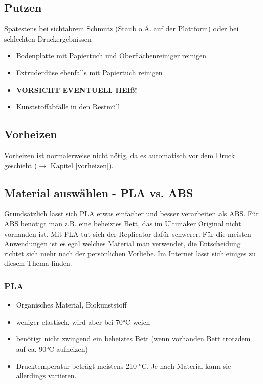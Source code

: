\documentclass{\basedir/fablab-document}
\begin{document}
\subsection{Putzen} \label{putzen}

Spätestens bei sichtabrem Schmutz (Staub o.Ä. auf der Plattform) oder bei schlechten Druckergebnissen

\begin{itemize}
 \item Bodenplatte mit Papiertuch und Oberflächenreiniger reinigen
 \item Extruderdüse ebenfalls mit Papiertuch reinigen
 \item \textbf{VORSICHT EVENTUELL HEIß!}
 \item Kunststoffabfälle in den Restmüll
\end{itemize}

\subsection{Vorheizen}
Vorheizen ist normalerweise nicht nötig, da es automatisch vor dem Druck geschieht ($\to$ Kapitel \ref{vorheizen}).

\subsection{Material auswählen - PLA vs. ABS}
Grundsätzlich lässt sich PLA etwas einfacher und besser verarbeiten als ABS. Für ABS benötigt man z.B. eine beheiztes
Bett, das im Ultimaker Original nicht vorhanden ist. Mit PLA tut sich der Replicator dafür schwerer. Für die meisten
Anwendungen ist es egal welches Material man verwendet, die Entscheidung richtet sich mehr nach der persönlichen
Vorliebe. Im Internet lässt sich einiges zu diesem Thema finden.

\subsubsection{PLA}
\begin{itemize}
\item Organisches Material, Biokunststoff
\item weniger elastisch, wird aber bei 70°C weich
\item benötigt nicht zwingend ein beheiztes Bett (wenn vorhanden Bett trotzdem auf ca. 90°C aufheizen)
\item Drucktemperatur beträgt meistens 210 °C. Je nach Material kann sie allerdings variieren.
\end{itemize}
\end{document}
